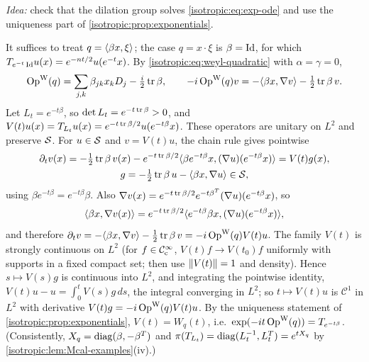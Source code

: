 \emph{Idea:} check that the dilation group solves \eqref{isotropic:eq:exp-ode}
and use the uniqueness part of \cref{isotropic:prop:exponentials}.

It suffices to treat $q=\langle \beta x, \xi\rangle$; the case $q=x\cdot\xi$ is $\beta=\operatorname{Id}$,
for which $T_{e^{-t}\operatorname{Id}}u(x)=e^{-nt/2}u(e^{-t}x)$. By
\eqref{isotropic:eq:weyl-quadratic} with $\alpha=\gamma=0$,
\begin{equation*}
  \operatorname{Op}^{\mathrm{W}}(q)=\sum_{j,k}\beta_{jk}x_kD_j-\tfrac i2\operatorname{tr}\beta,\qquad
  -i\operatorname{Op}^{\mathrm{W}}(q)v=-\langle \beta x, \nabla v\rangle-\tfrac12\operatorname{tr}\beta\,v .
\end{equation*}
Let $L_t=e^{-t\beta}$, so $\det L_t=e^{-t\operatorname{tr}\beta}>0$, and
$V(t)u(x)=T_{L_t}u(x)=e^{-t\operatorname{tr}\beta/2}u(e^{-t\beta}x)$. These operators are
unitary on $L^2$ and preserve $\mathcal{S}$. For $u\in\mathcal{S}$ and $v=V(t)u$, the chain rule
gives pointwise
\begin{equation*}
\begin{gathered}
  \partial_tv(x)=-\tfrac12\operatorname{tr}\beta\,v(x)-e^{-t\operatorname{tr}\beta/2}\langle \beta e^{-t\beta}x, (\nabla u)(e^{-t\beta}x)\rangle
  =V(t)g(x),\\ g=-\tfrac12\operatorname{tr}\beta\,u-\langle \beta x, \nabla u\rangle\in\mathcal{S},
\end{gathered}
\end{equation*}
using $\beta e^{-t\beta}=e^{-t\beta}\beta$. Also
$\nabla v(x)=e^{-t\operatorname{tr}\beta/2}e^{-t\beta^T}(\nabla u)(e^{-t\beta}x)$, so
\begin{equation*}
  \langle \beta x, \nabla v(x)\rangle=e^{-t\operatorname{tr}\beta/2}\langle e^{-t\beta}\beta x, (\nabla u)(e^{-t\beta}x)\rangle,
\end{equation*}
and therefore $\partial_tv=-\langle \beta x, \nabla v\rangle-\frac12\operatorname{tr}\beta\,v=-i\operatorname{Op}^{\mathrm{W}}(q)V(t)u$.
The family $V(t)$ is strongly continuous on $L^2$ (for $f\in\mathcal{C}^\infty_{\mathrm{c}}$,
$V(t)f\to V(t_0)f$ uniformly with supports in a fixed compact set; then use
$\lVert V(t)\rVert=1$ and density). Hence $s\mapsto V(s)g$ is continuous into $L^2$,
and integrating the pointwise identity, $V(t)u-u=\int_0^tV(s)g\,ds$, the integral
converging in $L^2$; so $t\mapsto V(t)u$ is $\mathcal C^1$ in $L^2$ with derivative
$V(t)g=-i\operatorname{Op}^{\mathrm{W}}(q)V(t)u$. By the uniqueness statement of
\cref{isotropic:prop:exponentials}, $V(t)=W_q(t)$, i.e.\
$\exp(-it\operatorname{Op}^{\mathrm{W}}(q))=T_{e^{-t\beta}}$. (Consistently, $X_q=\operatorname{diag}(\beta,-\beta^T)$ and
$\pi(T_{L_t})=\operatorname{diag}(L_t^{-1},L_t^T)=e^{tX_q}$ by
\cref{isotropic:lem:Mcal-examples}(iv).)

\subsection*{\Cref{isotropic:ex:mehler}}


